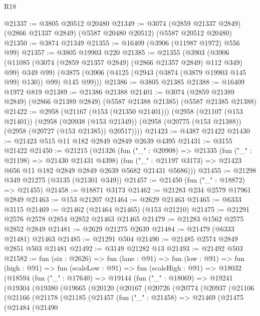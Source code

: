 \begin{lexlean}{R18}
\begin{coremodule}
@21337 := @3805 @20512 @20480
@21349 := @3074
    (@2859 @21337 @2849)
    (@2866 @21337 @2849)
    (@5587 @20480 @20512)
    (@5587 @20512 @20480)
@21350 := @3874 @21349
@21355 := @16409 (@3906 (@11987 @1972) @556 @99)
@21357 := @3805 @19903 @220
@21385 := @21355
    (@3903
      (@3906 (@11085 (@3074 (@2859 @21357 @2849) (@2866 @21357 @2849) @112 @349) @99) @349 @99)
      (@3875 (@3906 (@4125 (@2943 (@3874 (@3879 @19903 @145 @99) @130)) @99) @145 @99)))
@21386 := @3805 @21385
@21388 := @16409 @1972 @819
@21389 := @21386 @21388
@21401 := @3074
    (@2859 @21389 @2849)
    (@2866 @21389 @2849)
    (@5587 @21388 @21385)
    (@5587 @21385 @21388)
@21422 := @2958
    (@21167 (@153 (@21350 @21401)))
    (@2958
      (@21107 (@153 @21401))
      (@2958
        (@20938 (@153 @21349))
        (@2958 (@20775 (@153 @21388)) (@2958 (@20727 (@153 @21385)) @20517))))
@21423 := @4387 @21422
@21430 := @21423 @515 @11 @182 @2849 @2849 @2639 @4395
@21431 := @3155 @21422
@21450 := @21215
    (@21326
      (fun ("_" : @20908) =>
      @21335
        (fun ("_" : @21198) => @21430 @21431 @4398)
        (fun ("_" : @21197 @3173) => @21423 @656 @11 @182 @2849 @2849 @2639 @5682 @21431 @5686)))
@21455 := @21298 @349 @21275 (@3135 (@21301 @349))
@21457 := @21450 (fun ("_" : @18872) => @21455)
@21458 := @18871 @3173
@21462 := @21283 @234 @2579 @17961 @2849
@21463 := @153 @21207
@21464 := @2629 @21463
@21465 := @6333 @3115
@21469 := @21462 (@21464 @21465) (@153 @21210)
@21475 := @21291 @2576 @2578 @2854 @2852 @21463 @21465
@21479 := @21283 @1562 @2575 @2852 @2849
@21481 := @2629 @21275 @2639
@21484 := @21479 (@6333 @21481) @21463
@21485 := @21291 @504
@21490 := @21485 @2574 @2849 @2851 @503 @21481
@21492 := @3149 @21282 @13
@21493 := @21492 @503
@21582 := fun (six : @2626) =>
  fun (lane : @91) =>
  fun (low : @91) =>
  fun (high : @91) =>
  fun (scaleLow : @91) =>
  fun (scaleHigh : @91) =>
  @18032
    (@18594
      (fun ("_" : @17640) =>
      @19144
        (fun ("_" : @18069) =>
        @19241
          (@19304
            (@19380
              (@19665
                (@20120
                  (@20167
                    (@20726
                      (@20774
                        (@20937
                          (@21106
                            (@21166
                              (@21178
                                (@21185
                                  (@21457
                                    (fun ("_" : @21458) =>
                                    @21469
                                      (@21475
                                        (@21484
                                          (@21490

\end{coremodule}
\end{lexlean}
